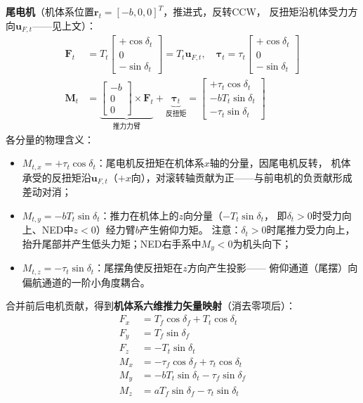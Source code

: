 \textbf{尾电机}（机体系位置$\bm{r}_t = [-b, 0, 0]^T$，推进式，反转CCW，
反扭矩沿机体受力方向$\bm{u}_{F,t}$——见上文）：
\begin{align}
    \bm{F}_t &= T_t \begin{bmatrix} +\cos\delta_t \\ 0 \\ -\sin\delta_t \end{bmatrix}
    = T_t \bm{u}_{F,t},
    \quad
    \bm{\tau}_t = \tau_t \begin{bmatrix} +\cos\delta_t \\ 0 \\ -\sin\delta_t \end{bmatrix}
    \label{eq:rear_force} \\
    \bm{M}_t &= \underbrace{\begin{bmatrix} -b \\ 0 \\ 0 \end{bmatrix} \times \bm{F}_t}_{\text{推力力臂}}
             + \underbrace{\bm{\tau}_t}_{\text{反扭矩}}
             = \begin{bmatrix}
                 +\tau_t \cos\delta_t \\
                 -b T_t \sin\delta_t \\
                 -\tau_t \sin\delta_t
               \end{bmatrix}
    \label{eq:rear_moment}
\end{align}
各分量的物理含义：
\begin{itemize}
    \item $M_{t,x} = +\tau_t \cos\delta_t$：尾电机反扭矩在机体系$x$轴的分量，因尾电机反转，
          机体承受的反扭矩沿$\bm{u}_{F,t}$（$+x$向），对滚转轴贡献为正——与前电机的负贡献形成差动对消；
    \item $M_{t,y} = -b T_t \sin\delta_t$：推力在机体上的$z$向分量（$-T_t\sin\delta_t$，
          即$\delta_t>0$时受力向上、NED中$z<0$）经力臂$b$产生俯仰力矩。
          注意：$\delta_t>0$时尾推力受力向上，抬升尾部并产生低头力矩；NED右手系中$M_y<0$为机头向下；
    \item $M_{t,z} = -\tau_t \sin\delta_t$：尾摆角使反扭矩在$z$方向产生投影——
          俯仰通道（尾摆）向偏航通道的一阶小角度耦合。
\end{itemize}

合并前后电机贡献，得到\textbf{机体系六维推力矢量映射}（消去零项后）：
\begin{equation}
    \boxed{
    \begin{aligned}
        F_x &= T_f \cos\delta_f + T_t \cos\delta_t \\[2pt]
        F_y &= T_f \sin\delta_f \\[2pt]
        F_z &= -T_t \sin\delta_t \\[6pt]
        M_x &= -\tau_f \cos\delta_f + \tau_t \cos\delta_t \\[2pt]
        M_y &= -b T_t \sin\delta_t - \tau_f \sin\delta_f \\[2pt]
        M_z &= a T_f \sin\delta_f - \tau_t \sin\delta_t
    \end{aligned}}
    \label{eq:six_component}
\end{equation}

